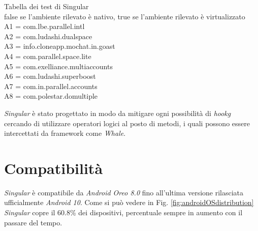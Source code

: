 \begin{table} [H]
{{}
}
\caption[Tabella dei test di Singular]{Tabella dei test di Singular \\ false se l’ambiente rilevato è nativo, true se l’ambiente rilevato è virtualizzato \\ A1 = com.lbe.parallel.intl \\ A2 = com.ludashi.dualspace \\ A3 = 
info.cloneapp.mochat.in.goast \\ A4 = 
com.parallel.space.lite \\ A5 =
com.exelliance.multiaccounts \\ A6 =
com.ludashi.superboost \\ A7 =
com.in.parallel.accounts \\ A8 =
com.polestar.domultiple}
\label{tab:singular_device_tests}
\end{table}



\emph{Singular} è stato progettato in modo da mitigare ogni possibilità di \emph{\gls{hookg}} cercando di utilizzare operatori logici al posto di metodi, i quali possono essere intercettati da framework come \emph{Whale}. 



\newpage
\section{Compatibilità}

\emph{Singular} è compatibile da \emph{Android Oreo 8.0} fino all'ultima versione rilasciata ufficialmente \emph{Android 10}. Come si può vedere in Fig. \ref{fig:androidOSdistribution} \emph{Singular} copre il 60.8\% dei dispositivi, percentuale sempre in aumento con il passare del tempo.

